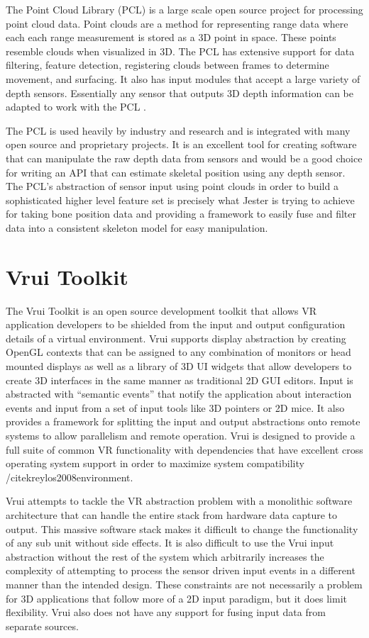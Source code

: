 The Point Cloud Library (PCL) is a large scale open source project for processing point cloud data. Point clouds are a method for representing range data where each each range measurement is stored as a 3D point in space. These points resemble clouds when visualized in 3D. The PCL has extensive support for data filtering, feature detection, registering clouds between frames to determine movement, and surfacing. It also has input modules that accept a large variety of depth sensors. Essentially any sensor that outputs 3D depth information can be adapted to work with the PCL \cite{rusu20113d}.

The PCL is used heavily by industry and research and is integrated with many open source and proprietary projects. It is an excellent tool for creating software that can manipulate the raw depth data from sensors and would be a good choice for writing an API that can estimate skeletal position using any depth sensor. The PCL’s abstraction of sensor input using point clouds in order to build a sophisticated higher level feature set is precisely what Jester is trying to achieve for taking bone position data and providing a framework to easily fuse and filter data into a consistent skeleton model for easy manipulation.

\section{Vrui Toolkit}

The Vrui Toolkit is an open source development toolkit that allows VR application developers to be shielded from the input and output configuration details of a virtual environment. Vrui supports display abstraction by creating OpenGL contexts that can be assigned to any combination of monitors or head mounted displays as well as a library of 3D UI widgets that allow developers to create 3D interfaces in the same manner as traditional 2D GUI editors. Input is abstracted with “semantic events” that notify the application about interaction events and input from a set of input tools like 3D pointers or 2D mice. It also provides a framework for splitting the input and output abstractions onto remote systems to allow parallelism and remote operation. Vrui is designed to provide a full suite of common VR functionality with dependencies that have excellent cross operating system support in order to maximize system compatibility /cite{kreylos2008environment}. 

Vrui attempts to tackle the VR abstraction problem with a monolithic software architecture that can handle the entire stack from hardware data capture to output. This massive software stack makes it difficult to change the functionality of any sub unit without side effects. It is also difficult to use the Vrui input abstraction without the rest of the system which arbitrarily increases the complexity of attempting to process the sensor driven input events in a different manner than the intended design. These constraints are not necessarily a problem for 3D applications that follow more of a 2D input paradigm, but it does limit flexibility. Vrui also does not have any support for fusing input data from separate sources.

